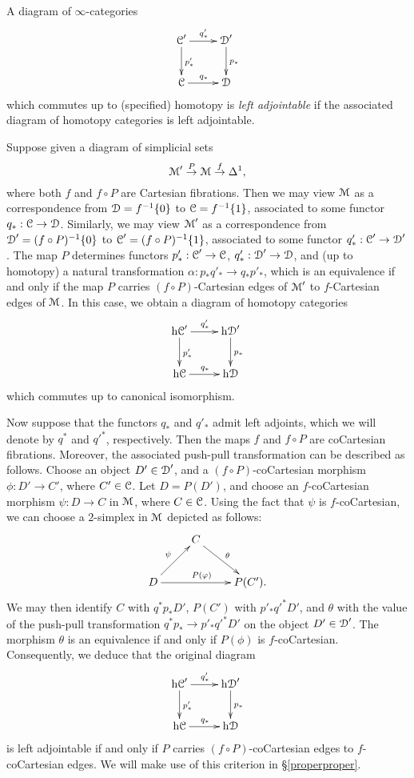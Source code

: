 \begin{definition}
A diagram of $\infty$-categories
$$ \xymatrix{ \calC' \ar[r]^{q'_{\ast}} \ar[d]^{p'_{\ast}} & \calD' \ar[d]^{p_{\ast}} \\ \calC \ar[r]^{q_{\ast}} & \calD }$$ which commutes up to (specified) homotopy is {\it left adjointable} if the associated
diagram of homotopy categories is left adjointable.
\end{definition}

\begin{remark}\label{toadcatcher}
Suppose given a diagram of simplicial sets
$$ \operatorname{\mathcal{M}}' \stackrel{P}{\rightarrow} \operatorname{\mathcal{M}} \stackrel{f}{\rightarrow} \Delta^1,$$
where both $f$ and $f \circ P$ are Cartesian fibrations. Then we may view
$\operatorname{\mathcal{M}}$ as a correspondence from $\operatorname{\mathcal{D}} = f^{-1} \{0\}$ to $\operatorname{\mathcal{C}} = f^{-1} \{1\}$, associated
to some functor $q_{\ast}: \operatorname{\mathcal{C}} \rightarrow \operatorname{\mathcal{D}}$. Similarly, we may view
$\operatorname{\mathcal{M}}'$ as a correspondence from $\operatorname{\mathcal{D}}' = (f \circ P)^{-1} \{0\}$ to
$\operatorname{\mathcal{C}}' = (f \circ P)^{-1} \{1\}$, associated to some functor $q'_{\ast}: \operatorname{\mathcal{C}}' \rightarrow \operatorname{\mathcal{D}}'$.
The map $P$ determines functors $p'_{\ast}: \operatorname{\mathcal{C}}' \rightarrow \operatorname{\mathcal{C}}$, $q'_{\ast}: \operatorname{\mathcal{D}}' \rightarrow \operatorname{\mathcal{D}}$, and (up to homotopy) a natural transformation $\alpha: p_{\ast} q'_{\ast} \rightarrow
q_{\ast} p'_{\ast}$, which is an equivalence if and only if the map $P$ carries
$(f \circ P)$-Cartesian edges of $\operatorname{\mathcal{M}}'$ to $f$-Cartesian edges of $\operatorname{\mathcal{M}}$. In this case,
we obtain a diagram of homotopy categories
$$ \xymatrix{ \h{\calC'} \ar[r]^{q'_{\ast}} \ar[d]^{p'_{\ast}} & \h{\calD'} \ar[d]^{p_{\ast}} \\ \h{\calC} \ar[r]^{q_{\ast}} & \h{\calD} }$$
which commutes up to canonical isomorphism. 

Now suppose that the functors $q_{\ast}$ and $q'_{\ast}$ admit left adjoints, which we will denote by $q^{\ast}$ and ${q'}^{\ast}$, respectively. Then the maps $f$ and $f \circ P$ are coCartesian fibrations. Moreover, the associated push-pull transformation can be described as follows. 
Choose an object $D' \in \operatorname{\mathcal{D}}'$, and a $(f \circ P)$-coCartesian morphism
$\phi: D' \rightarrow C'$, where $C' \in \operatorname{\mathcal{C}}$. Let $D = P(D')$, and choose an $f$-coCartesian morphism $\psi: D \rightarrow C$ in $\operatorname{\mathcal{M}}$, where $C \in \operatorname{\mathcal{C}}$. Using the fact that
$\psi$ is $f$-coCartesian, we can choose a $2$-simplex in $\operatorname{\mathcal{M}}$ depicted as follows:
$$ \xymatrix{ & C \ar[dr]^{\theta} & \\
D \ar[ur]^{\psi} \ar[rr]^{P(\phi)} & & P(C'). }$$ 
We may then identify $C$ with $q^{\ast} p_{\ast} D'$, $P(C')$ with $p'_{\ast} {q'}^{\ast} D'$, and
$\theta$ with the value of the push-pull transformation $q^{\ast} p_{\ast} \rightarrow p'_{\ast} {q'}^{\ast} D'$ on the object $D' \in \operatorname{\mathcal{D}}'$. The morphism $\theta$ is an equivalence if and only if $P(\phi)$ is $f$-coCartesian. Consequently, we deduce that the original diagram
$$ \xymatrix{ \h{\calC'} \ar[r]^{q'_{\ast}} \ar[d]^{p'_{\ast}} & \h{\calD'} \ar[d]^{p_{\ast}} \\ \h{\calC} \ar[r]^{q_{\ast}} & \h{\calD} }$$
is left adjointable if and only if $P$ carries $(f \circ P)$-coCartesian edges to $f$-coCartesian edges. We will make use of this criterion in \S \ref{properproper}.
\end{remark}

